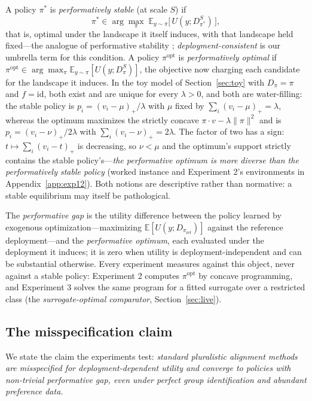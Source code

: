 ﻿\documentclass[11pt]{article}
\begin{document}
A policy \(\pi^\ast\) is \emph{performatively stable} (at scale \(S\)) if
\[\pi^\ast \in \arg\max_{\pi}\; \mathbb{E}_{y \sim \pi}\big[\,U(y; D_{\pi^\ast}^S)\,\big],\]
that is, optimal under the landscape it itself induces, with that landscape held fixed---the analogue of performative stability \citep{perdomo2020}; \emph{deployment-consistent} is our umbrella term for this condition. A policy \(\pi^{\mathrm{opt}}\) is \emph{performatively optimal} if \(\pi^{\mathrm{opt}} \in \arg\max_{\pi} \mathbb{E}_{y \sim \pi}[U(y; D_{\pi}^S)]\), the objective now charging each candidate for the landscape it induces. In the toy model of Section~\ref{sec:toy} with \(D_\pi = \pi\) and \(f = \mathrm{id}\), both exist and are unique for every \(\lambda > 0\), and both are water-filling: the stable policy is \(p_i = (v_i - \mu)_+/\lambda\) with \(\mu\) fixed by \(\sum_i (v_i - \mu)_+ = \lambda\), whereas the optimum maximizes the strictly concave \(\pi \cdot v - \lambda\lVert\pi\rVert^2\) and is \(p_i = (v_i - \nu)_+/2\lambda\) with \(\sum_i (v_i - \nu)_+ = 2\lambda\). The factor of two has a sign: \(t \mapsto \sum_i (v_i - t)_+\) is decreasing, so \(\nu < \mu\) and the optimum's support strictly contains the stable policy's---\emph{the performative optimum is more diverse than the performatively stable policy} (worked instance and Experiment 2's environments in Appendix~\ref{app:exp12}). Both notions are descriptive rather than normative: a stable equilibrium may itself be pathological.

The \emph{performative gap} is the utility difference between the policy learned by exogenous optimization---maximizing \(\mathbb{E}[U(y; D_{\pi_{\text{ref}}})]\) against the reference deployment---and the \emph{performative optimum}, each evaluated under the deployment it induces; it is zero when utility is deployment-independent and can be substantial otherwise. Every experiment measures against this object, never against a stable policy: Experiment 2 computes \(\pi^{\mathrm{opt}}\) by concave programming, and Experiment 3 solves the same program for a fitted surrogate over a restricted class (the \emph{surrogate-optimal comparator}, Section~\ref{sec:live}).

\subsection{The misspecification claim}
\label{sec:claim}

We state the claim the experiments test: \emph{standard pluralistic alignment methods are misspecified for deployment-dependent utility and converge to policies with non-trivial performative gap, even under perfect group identification and abundant preference data.}
\end{document}
